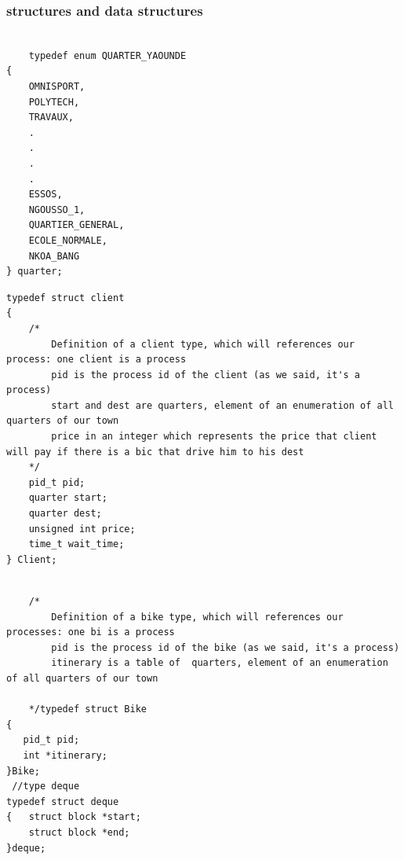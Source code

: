 \subsubsection*{ structures and data structures}
   \begin{lstlisting}[style=customc, caption={quarter}]
  
    typedef enum QUARTER_YAOUNDE
{
    OMNISPORT,
    POLYTECH,
    TRAVAUX,
    .
    .
    .
    .
    ESSOS,
    NGOUSSO_1,
    QUARTIER_GENERAL,
    ECOLE_NORMALE,
    NKOA_BANG
} quarter;
\end{lstlisting}    
\begin{lstlisting}[style=customc, caption={client and bike}]
    typedef struct client
{
    /*
        Definition of a client type, which will references our process: one client is a process
        pid is the process id of the client (as we said, it's a process)
        start and dest are quarters, element of an enumeration of all quarters of our town
        price in an integer which represents the price that client will pay if there is a bic that drive him to his dest
    */
    pid_t pid;
    quarter start;
    quarter dest;
    unsigned int price;
    time_t wait_time;
} Client;
\end{lstlisting}
\newpage
 \begin{lstlisting}[style=customc, caption={bike}]
   
    /*
        Definition of a bike type, which will references our processes: one bi is a process
        pid is the process id of the bike (as we said, it's a process)
        itinerary is a table of  quarters, element of an enumeration of all quarters of our town
        
    */typedef struct Bike
{
   pid_t pid;
   int *itinerary;
}Bike;
 //type deque
typedef struct deque 
{   struct block *start;
    struct block *end;
}deque;

\end{lstlisting}

